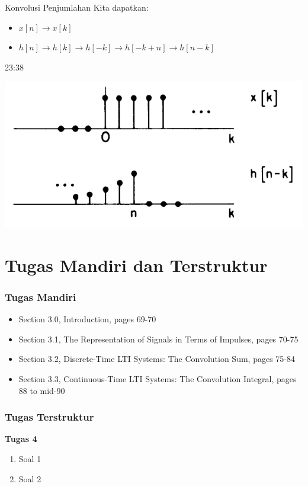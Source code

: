 \documentclass[pdflatex,compress,mathserif]{beamer}
\begin{document}
\begin{frame}{Konvolusi Penjumlahan}
	Kita dapatkan:\\
	\begin{itemize}
		\item $ x[n] \rightarrow x[k] $
		\item $ h[n] \rightarrow h[k] \rightarrow h[-k] \rightarrow h[-k+n] \rightarrow h[n-k]$
	\end{itemize}
	23:38
	\begin{center}
		\includegraphics[width=0.8\linewidth]{img/img11}
	\end{center}
	
\end{frame}
	

\section{Tugas Mandiri dan Terstruktur}

\begin{frame}
	\frametitle{Tugas Mandiri}
	\begin{itemize}
		\item Section 3.0, Introduction, pages 69-70
		\item Section 3.1, The Representation of Signals in Terms of Impulses, pages 70-75
		\item Section 3.2, Discrete-Time LTI Systems: The Convolution Sum, pages 75-84
		\item Section 3.3, Continuous-Time LTI Systems: The Convolution Integral, pages 88 to mid-90
	\end{itemize}
\end{frame}

\begin{frame}
	\frametitle{Tugas Terstruktur}
	\textbf{Tugas 4}
	\begin{enumerate}
		\item Soal 1 
		\item Soal 2
	\end{enumerate}
\end{frame}
\end{document}
